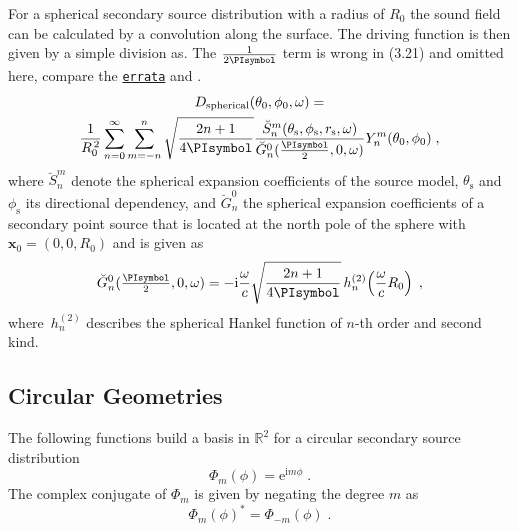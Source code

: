 \documentclass[a4paper]{book}
\renewcommand{\url}[2]{\href{#2}{\color{link}\texttt{#1}}}%
\newcommand{\PI}{\PIsymbol}%
\newcommand{\I}{\mathrm{i}}                          %
\newcommand{\E}{\mathrm{e}}                          %
\renewcommand{\vec}[1]{\mathbf{#1}}                  %
\newcommand{\x}{\vec{x}}                             %
\newcommand{\omegac}{\frac{\omega}{c}}               %
\newcommand{\h}[2]{\,h_{#1}^{(#2)}\!}                %
\newcommand{\R}{\mathbb{R}}                          %
\newcommand{\qc}{\;,}                                             %
\newcommand{\qp}{\;.}                                             %
\begin{document}
{For a spherical secondary source distribution with a radius of $R_0$
the sound field can be calculated by a convolution along the surface.
The driving function is then given by a simple division
as\cite[][(3.21)]{Ahrens2012}. The $\frac{1}{2\PI}$ term is wrong in
(3.21) and omitted here, compare the
\url{errata}{http://www.soundfieldsynthesis.org/errata/} and \cite[][(24)]{Schultz2014}.
%
\begin{multline}
    D_\text{spherical}(\theta_0,\phi_0,\omega) = \\ 
    \frac{1}{R_0^{\,2}}
    \sum_{n=0}^\infty \sum_{m=-n}^n \sqrt{\frac{2n+1}{4\PI}}
    \frac{\breve{S}_n^m(\theta_\text{s},\phi_\text{s},r_\text{s},\omega)}
    {\breve{G}_n^0(\frac{\PI}{2},0,\omega)} Y_n^m(\theta_0,\phi_0) \qc
    \label{eq:D_spherical}
\end{multline}
%
where $\breve{S}_n^m$ denote the spherical expansion
coefficients of the source model, $\theta_\text{s}$ and
$\phi_\text{s}$ its directional dependency, and $\breve{G}_n^0$
the spherical expansion coefficients of a
secondary point source that is located at the north pole of the sphere with $\x_0 =
(0,0,R_0)$ and is given as\cite[][(25)]{Schultz2014}
%
\begin{equation}
    \breve{G}_n^0(\tfrac{\PI}{2},0,\omega) =
    -\I\omegac \sqrt{\frac{2n+1}{4\PI}} \h{n}{2}\left(\omegac R_0\right) \qc
    \label{eq:G_spherical}
\end{equation}
where $\h{n}{2}$ describes the spherical Hankel function of $n$-th order and
second kind.


\subsection{Circular Geometries}
\label{sec:circular_geometries}

The following functions build a basis in $\R^2$ for a circular secondary source
distribution\cite{Williams1999}
%
\begin{equation}
    \Phi_m(\phi) = \E^{\I m\phi} \qp
    \label{eq:circular_harmonics}
\end{equation}
%
The complex conjugate of $\Phi_m$ is given by negating the degree $m$ as
%
\begin{equation}
    \Phi_m(\phi)^* = \Phi_{-m}(\phi) \qp
    \label{eq:Phi_complex_conjugate}
\end{equation}
%

}
\end{document}
